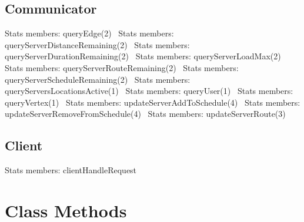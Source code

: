 \subsection{Communicator}
\nwenddocs{}\plusendmoddef
\LA{}Stats members: queryEdge(2)~{\nwtagstyle{}}\RA{}
\LA{}Stats members: queryServerDistanceRemaining(2)~{\nwtagstyle{}}\RA{}
\LA{}Stats members: queryServerDurationRemaining(2)~{\nwtagstyle{}}\RA{}
\LA{}Stats members: queryServerLoadMax(2)~{\nwtagstyle{}}\RA{}
\LA{}Stats members: queryServerRouteRemaining(2)~{\nwtagstyle{}}\RA{}
\LA{}Stats members: queryServerScheduleRemaining(2)~{\nwtagstyle{}}\RA{}
\LA{}Stats members: queryServersLocationsActive(1)~{\nwtagstyle{}}\RA{}
\LA{}Stats members: queryUser(1)~{\nwtagstyle{}}\RA{}
\LA{}Stats members: queryVertex(1)~{\nwtagstyle{}}\RA{}
\LA{}Stats members: updateServerAddToSchedule(4)~{\nwtagstyle{}}\RA{}
\LA{}Stats members: updateServerRemoveFromSchedule(4)~{\nwtagstyle{}}\RA{}
\LA{}Stats members: updateServerRoute(3)~{\nwtagstyle{}}\RA{}
\nwendcode{}\nwdocspar

\subsection{Client}
\nwenddocs{}\plusendmoddef
\LA{}Stats members: clientHandleRequest~{\nwtagstyle{}}\RA{}
\nwendcode{}\nwdocspar

\section{Class Methods}
